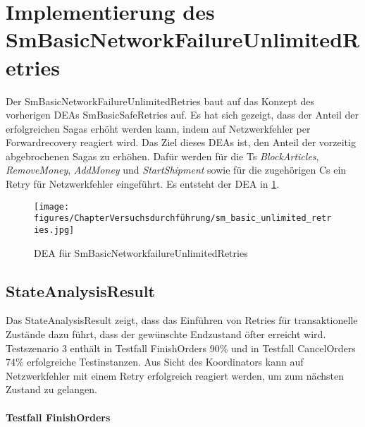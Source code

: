 \section{Implementierung des SmBasicNetworkFailureUnlimitedRetries}

Der SmBasicNetworkFailureUnlimitedRetries baut auf das Konzept des vorherigen DEAs SmBasicSafeRetries auf. Es hat sich gezeigt, dass der Anteil der erfolgreichen Sagas erhöht werden kann, indem auf Netzwerkfehler per Forwardrecovery reagiert wird. Das Ziel dieses DEAs ist, den Anteil der vorzeitig abgebrochenen Sagas zu erhöhen. Dafür werden für die Ts \textit{BlockArticles}, \textit{RemoveMoney}, \textit{AddMoney} und \textit{StartShipment} sowie für die zugehörigen Cs ein Retry für Netzwerkfehler eingeführt. Es entsteht der DEA in \cref{fig:SmBasicNetworkfailureUnlimitedRetries}.

\begin{figure}[h!]
	\centering
	\texttt{[image: figures/ChapterVersuchsdurchführung/sm\_basic\_unlimited\_retries.jpg]}
	\caption{DEA für SmBasicNetworkfailureUnlimitedRetries}
	\label{fig:SmBasicNetworkfailureUnlimitedRetries}
\end{figure}
\FloatBarrier

\subsection{StateAnalysisResult}

Das StateAnalysisResult zeigt, dass das Einführen von Retries für transaktionelle Zustände dazu führt, dass der gewünschte Endzustand öfter erreicht wird. Testszenario 3 enthält in Testfall FinishOrders 90\% und in Testfall CancelOrders 74\% erfolgreiche Testinstanzen. Aus Sicht des Koordinators kann auf Netzwerkfehler mit einem Retry erfolgreich reagiert werden, um zum nächsten Zustand zu gelangen.

\paragraph*{Testfall FinishOrders} \mbox{}\\

